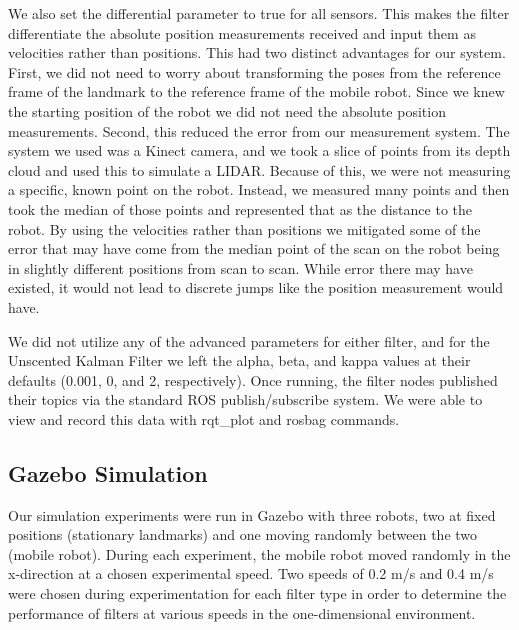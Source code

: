 \documentclass[conference]{IEEEtran} \usepackage[T1]{fontenc} \usepackage[backend=biber, style=ieee]{biblatex}
\begin{document}
We also set the differential parameter to true for all sensors. This makes the filter differentiate the absolute
position measurements received and input them as velocities rather than positions. This had two distinct advantages for
our system. First, we did not need to worry about transforming the poses from the reference frame of the landmark to the
reference frame of the mobile robot. Since we knew the starting position of the robot we did not need the absolute
position measurements. Second, this reduced the error from our measurement system. The system we used was a Kinect
camera, and we took a slice of points from its depth cloud and used this to simulate a LIDAR. Because of this, we were
not measuring a specific, known point on the robot. Instead, we measured many points and then took the median of those
points and represented that as the distance to the robot. By using the velocities rather than positions we mitigated
some of the error that may have come from the median point of the scan on the robot being in slightly different
positions from scan to scan. While error there may have existed, it would not lead to discrete jumps like the position
measurement would have.

We did not utilize any of the advanced parameters for either filter, and for the Unscented Kalman Filter we left the
alpha, beta, and kappa values at their defaults (0.001, 0, and 2, respectively). Once running, the filter nodes
published their topics via the standard ROS publish/subscribe system. We were able to view and record this data 
with rqt\_plot and rosbag commands.


\subsection{Gazebo Simulation} \label{Gazebo Simulation} Our simulation experiments were run in Gazebo with three
robots, two at fixed positions (stationary landmarks) and one moving randomly between the two (mobile robot). During
each experiment, the mobile robot moved randomly in the x-direction at a chosen experimental speed. Two speeds of 0.2
m/s and 0.4 m/s were chosen during experimentation for each filter type in order to determine the performance of filters
at various speeds in the one-dimensional environment.
\end{document}

